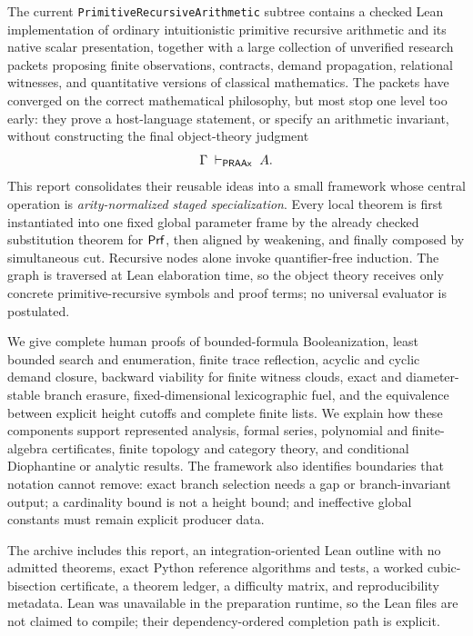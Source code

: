The current \texttt{PrimitiveRecursiveArithmetic} subtree contains a checked Lean implementation of ordinary intuitionistic primitive recursive arithmetic and its native scalar presentation, together with a large collection of unverified research packets proposing finite observations, contracts, demand propagation, relational witnesses, and quantitative versions of classical mathematics.  The packets have converged on the correct mathematical philosophy, but most stop one level too early: they prove a host-language statement, or specify an arithmetic invariant, without constructing the final object-theory judgment
\[
   \Gamma\;\vdash_{\mathsf{PRAAx}}\;A.
\]
This report consolidates their reusable ideas into a small framework whose central operation is \emph{arity-normalized staged specialization}.  Every local theorem is first instantiated into one fixed global parameter frame by the already checked substitution theorem for \(\mathsf{Prf}\), then aligned by weakening, and finally composed by simultaneous cut.  Recursive nodes alone invoke quantifier-free induction.  The graph is traversed at Lean elaboration time, so the object theory receives only concrete primitive-recursive symbols and proof terms; no universal evaluator is postulated.

We give complete human proofs of bounded-formula Booleanization, least bounded search and enumeration, finite trace reflection, acyclic and cyclic demand closure, backward viability for finite witness clouds, exact and diameter-stable branch erasure, fixed-dimensional lexicographic fuel, and the equivalence between explicit height cutoffs and complete finite lists.  We explain how these components support represented analysis, formal series, polynomial and finite-algebra certificates, finite topology and category theory, and conditional Diophantine or analytic results.  The framework also identifies boundaries that notation cannot remove: exact branch selection needs a gap or branch-invariant output; a cardinality bound is not a height bound; and ineffective global constants must remain explicit producer data.

The archive includes this report, an integration-oriented Lean outline with no admitted theorems, exact Python reference algorithms and tests, a worked cubic-bisection certificate, a theorem ledger, a difficulty matrix, and reproducibility metadata.  Lean was unavailable in the preparation runtime, so the Lean files are not claimed to compile; their dependency-ordered completion path is explicit.
